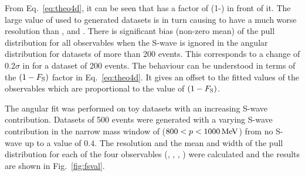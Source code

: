 From Eq.~\ref{eq:theo4d}, it can be seen that  
has a factor of (1-\FL) in front of it. The large 
value of \FL used to generated datasets is 
in turn causing  to have a much worse 
resolution than \AFB, \FL and  . There is 
significant bias (non-zero mean) of the pull distribution for all
 observables when the S-wave is ignored in the angular distribution for datasets 
 of more than 200 events. This corresponds to a 
 change of 0.2$\sigma$ in \FL for a dataset of 200 events.
The behaviour can be understood in terms of the $(1-F_{\mathrm{S}})$ 
factor in Eq.~\ref{eq:theo4d}. It gives an offset to the 
fitted values of the observables which are proportional 
to the value of $(1-F_{\mathrm{S}})$.

The angular fit was performed on toy 
datasets with an increasing S-wave contribution.
Datasets of 500 events were generated with a 
varying S-wave contribution in the narrow \psq
 mass window of ($800 < p < 1000 \mathrm{\,Me\kern -0.1em V}$) 
 from no S-wave up to a \FS value of $0.4$. 
The resolution and the mean and width of the pull 
distribution for each of the four observables
 (\AFB, \FL,  ,  ) were calculated and 
 the results are shown in Fig.~\ref{fig:fsval}.
